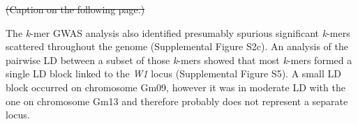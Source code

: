 \documentclass{article}
\providecommand{\DIFdeltex}[1]{{\protect\color{red}\sout{#1}}}                      %
\providecommand{\DIFdelbegin}{} %
\providecommand{\DIFdelend}{} %
\providecommand{\DIFdelFL}[1]{\DIFdel{#1}} %
\providecommand{\DIFdel}[1]{\texorpdfstring{\DIFdeltex{#1}}{}} %
\newcommand{\DIFscaledelfig}{0.5}
\newlength{\DIFdelgraphicswidth} %
\newlength{\DIFdelgraphicsheight} %
\newcommand{\DIFdelincludegraphics}[2][]{%
\sbox{\DIFdelgraphicsbox}{\DIFOincludegraphics[#1]{#2}}%
\settoboxwidth{\DIFdelgraphicswidth}{\DIFdelgraphicsbox} %
\settoboxtotalheight{\DIFdelgraphicsheight}{\DIFdelgraphicsbox} %
\scalebox{\DIFscaledelfig}{%
\parbox[b]{\DIFdelgraphicswidth}{\usebox{\DIFdelgraphicsbox}\\[-\baselineskip] \rule{\DIFdelgraphicswidth}{0em}}\llap{\resizebox{\DIFdelgraphicswidth}{\DIFdelgraphicsheight}{%
\setlength{\unitlength}{\DIFdelgraphicswidth}%
\begin{picture}(1,1)%
\thicklines\linethickness{2pt} %
{\color[rgb]{1,0,0}\put(0,0){\framebox(1,1){}}}%
{\color[rgb]{1,0,0}\put(0,0){\line( 1,1){1}}}%
{\color[rgb]{1,0,0}\put(0,1){\line(1,-1){1}}}%
\end{picture}%
}\hspace*{3pt}}} %
} %
\DeclareRobustCommand{\DIFdelbegin}{\DIFOdelbegin \let\includegraphics\DIFdelincludegraphics} %
\DeclareRobustCommand{\DIFdelend}{\DIFOaddend \let\includegraphics\DIFOincludegraphics} %
\begin{document}
\DIFdelbegin %
{%
\DIFdelFL{(Caption on the following page.)}}


\DIFdelend The \textit{k}-mer GWAS analysis also identified presumably spurious significant
\textit{k}-mers scattered throughout the genome (Supplemental Figure
S2c). An analysis of the pairwise LD between a subset
of those \textit{k}-mers showed that most \textit{k}-mers formed a single LD block
linked to the \textit{W1} locus (Supplemental Figure S5). A small LD block
occurred on chromosome Gm09, however it was in moderate LD with the one on chromosome
Gm13 and therefore probably does not represent a separate locus.
\end{document}

